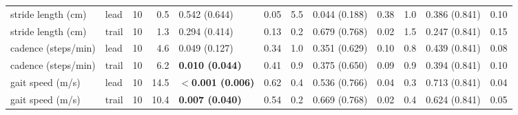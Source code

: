 \begin{adjustbox}{max width=\textwidth}
{\begin{tabular}{llrrlrrlrrlr}
stride length (cm) & lead & 10 & 0.5 & 0.542 (0.644) & 0.05 & 5.5 & 0.044 (0.188) & 0.38 & 1.0 & 0.386 (0.841) & 0.10 \\
stride length (cm) & trail & 10 & 1.3 & 0.294 (0.414) & 0.13 & 0.2 & 0.679 (0.768) & 0.02 & 1.5 & 0.247 (0.841) & 0.15 \\
cadence (steps/min) & lead & 10 & 4.6 & 0.049 (0.127) & 0.34 & 1.0 & 0.351 (0.629) & 0.10 & 0.8 & 0.439 (0.841) & 0.08 \\
cadence (steps/min) & trail & 10 & 6.2 & \textbf{0.010 (0.044)} & 0.41 & 0.9 & 0.375 (0.650) & 0.09 & 0.9 & 0.394 (0.841) & 0.10 \\
gait speed (m/s) & lead & 10 & 14.5 & \textbf{$<$0.001 (0.006)} & 0.62 & 0.4 & 0.536 (0.766) & 0.04 & 0.3 & 0.713 (0.841) & 0.04 \\
gait speed (m/s) & trail & 10 & 10.4 & \textbf{0.007 (0.040)} & 0.54 & 0.2 & 0.669 (0.768) & 0.02 & 0.4 & 0.624 (0.841) & 0.05 \\
\bottomrule
\end{tabular}
}
\end{adjustbox}
